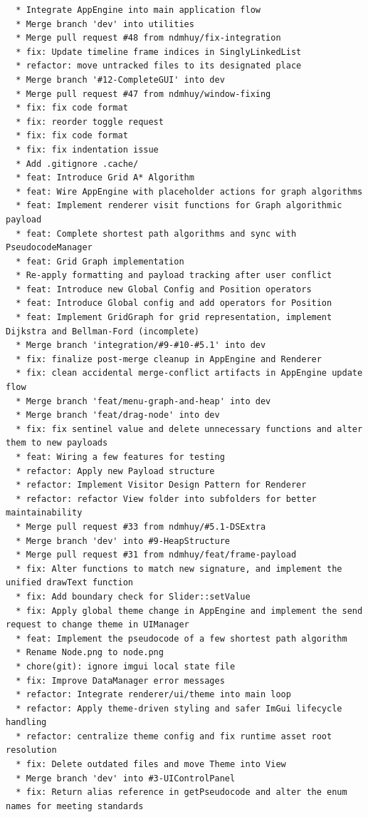 \begin{small}
\begin{verbatim}
  * Integrate AppEngine into main application flow
  * Merge branch 'dev' into utilities
  * Merge pull request #48 from ndmhuy/fix-integration
  * fix: Update timeline frame indices in SinglyLinkedList
  * refactor: move untracked files to its designated place
  * Merge branch '#12-CompleteGUI' into dev
  * Merge pull request #47 from ndmhuy/window-fixing
  * fix: fix code format
  * fix: reorder toggle request
  * fix: fix code format
  * fix: fix indentation issue
  * Add .gitignore .cache/
  * feat: Introduce Grid A* Algorithm
  * feat: Wire AppEngine with placeholder actions for graph algorithms
  * feat: Implement renderer visit functions for Graph algorithmic payload
  * feat: Complete shortest path algorithms and sync with PseudocodeManager
  * feat: Grid Graph implementation
  * Re-apply formatting and payload tracking after user conflict
  * feat: Introduce new Global Config and Position operators
  * feat: Introduce Global config and add operators for Position
  * feat: Implement GridGraph for grid representation, implement Dijkstra and Bellman-Ford (incomplete)
  * Merge branch 'integration/#9-#10-#5.1' into dev
  * fix: finalize post-merge cleanup in AppEngine and Renderer
  * fix: clean accidental merge-conflict artifacts in AppEngine update flow
  * Merge branch 'feat/menu-graph-and-heap' into dev
  * Merge branch 'feat/drag-node' into dev
  * fix: fix sentinel value and delete unnecessary functions and alter them to new payloads
  * feat: Wiring a few features for testing
  * refactor: Apply new Payload structure
  * refactor: Implement Visitor Design Pattern for Renderer
  * refactor: refactor View folder into subfolders for better maintainability
  * Merge pull request #33 from ndmhuy/#5.1-DSExtra
  * Merge branch 'dev' into #9-HeapStructure
  * Merge pull request #31 from ndmhuy/feat/frame-payload
  * fix: Alter functions to match new signature, and implement the unified drawText function
  * fix: Add boundary check for Slider::setValue
  * fix: Apply global theme change in AppEngine and implement the send request to change theme in UIManager
  * feat: Implement the pseudocode of a few shortest path algorithm
  * Rename Node.png to node.png
  * chore(git): ignore imgui local state file
  * fix: Improve DataManager error messages
  * refactor: Integrate renderer/ui/theme into main loop
  * refactor: Apply theme-driven styling and safer ImGui lifecycle handling
  * refactor: centralize theme config and fix runtime asset root resolution
  * fix: Delete outdated files and move Theme into View
  * Merge branch 'dev' into #3-UIControlPanel
  * fix: Return alias reference in getPseudocode and alter the enum names for meeting standards

\end{verbatim}
\end{small}
